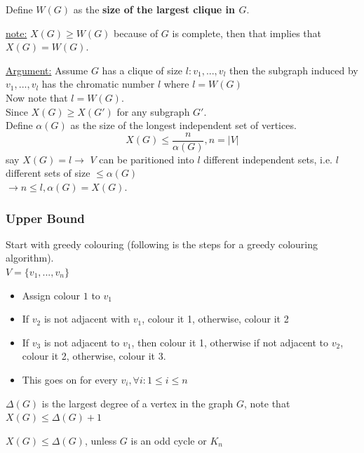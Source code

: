 \documentclass[12pt]{article}
\begin{document}
Define $W(G)$ as the \textbf{size of the largest clique in $G$}.

\begin{tcolorbox}
	\underline{note:} $X(G) \geq W(G)$ because of $G$ is complete, then that implies that $X(G) = W(G)$.
\end{tcolorbox}

\underline{Argument:} Assume $G$ has a clique of size $l : v_1, ..., v_l$ then the subgraph induced by $v_1, ... ,v_l$ has the chromatic number $l$ where $l = W(G)$\\
Now note that $l = W(G)$.\\
Since $X(G) \geq X(G')$ for any subgraph $G'$.\\
Define $\alpha (G)$ as the size of the longest independent set of vertices.\\
$$X(G) \leq \frac{n}{\alpha (G)}, n=|V|$$
say $X(G) = l \longrightarrow$ $V$ can be paritioned into $l$ different independent sets, i.e. $l$ different sets of size $\leq \alpha (G)$\\
$\longrightarrow n \leq l, \alpha (G) = X(G)$.

\subsubsection{Upper Bound}

Start with greedy colouring (following is the steps for a greedy colouring algorithm).\\
$V = \{ v_1, ..., v_n \}$
\begin{itemize}
	\item{Assign colour $1$ to $v_1$}
	\item{If $v_2$ is not adjacent with $v_1$, colour it 1, otherwise, colour it 2}
	\item{If $v_3$ is not adjacent to $v_1$, then colour it 1, otherwise if not adjacent to $v_2$, colour it 2, otherwise, colour it 3.}
	\item{This goes on for every $v_i, \forall i : 1\leq i \leq n$}
\end{itemize}

\begin{tcolorbox}[title=Definition: Largest degree of a vertex in the graph $G$]
	$\Delta (G)$ is the largest degree of a vertex in the graph $G$, note that $X(G) \leq \Delta (G) + 1$
\end{tcolorbox}

\begin{tcolorbox}[title=Brook's Theorem]
	$X(G) \leq \Delta (G)$, unless $G$ is an odd cycle or $K_n$
\end{tcolorbox}
\end{document}
